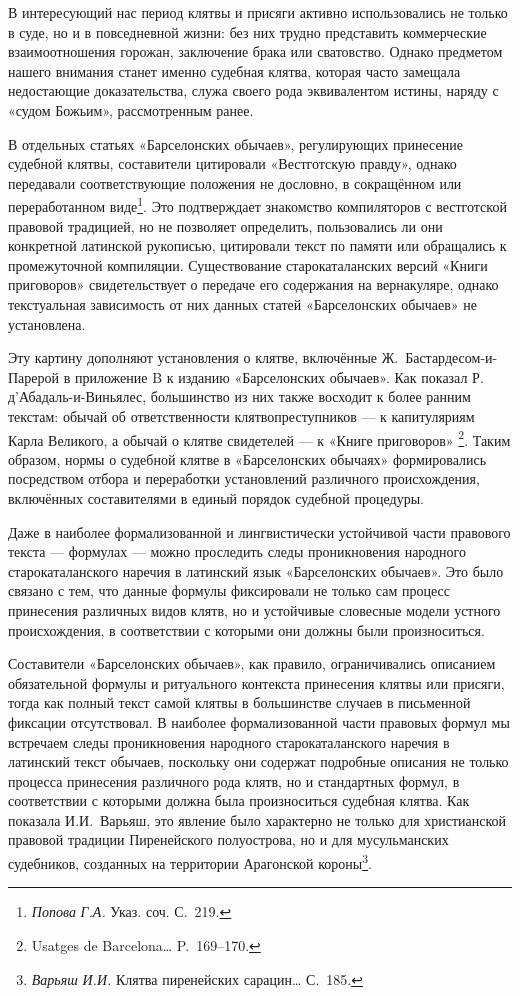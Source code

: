 В интересующий нас период клятвы и присяги активно использовались не только в суде, но и в повседневной жизни: без них трудно представить коммерческие взаимоотношения горожан, заключение брака или сватовство. Однако предметом нашего внимания станет именно судебная клятва, которая часто замещала недостающие доказательства, служа своего рода эквивалентом истины, наряду с «судом Божьим», рассмотренным ранее.

В отдельных статьях «Барселонских обычаев», регулирующих принесение судебной клятвы, составители цитировали «Вестготскую правду», однако передавали соответствующие положения не дословно, в сокращённом или переработанном виде\footnote{\emph{Попова}\emph{ }\emph{Г}\emph{.}\emph{А}\emph{. }Указ. соч. С.~219.}. Это подтверждает знакомство компиляторов с вестготской правовой традицией, но не позволяет определить, пользовались ли они конкретной латинской рукописью, цитировали текст по памяти или обращались к промежуточной компиляции. Существование старокаталанских версий «Книги приговоров» свидетельствует о передаче его содержания на вернакуляре, однако текстуальная зависимость от них данных статей «Барселонских обычаев» не установлена.

Эту картину дополняют установления о клятве, включённые Ж.~Бастардесом-и-Парерой в приложение B к изданию «Барселонских обычаев». Как показал Р. д’Абадаль-и-Виньялес, большинство из них также восходит к более ранним текстам: обычай об ответственности клятвопреступников --- к капитуляриям Карла Великого, а обычай о клятве свидетелей --- к «Книге приговоров» \footnote{Usatges de Barcelona… P.~169--170.}. Таким образом, нормы о судебной клятве в «Барселонских обычаях» формировались посредством отбора и переработки установлений различного происхождения, включённых составителями в единый порядок судебной процедуры.

Даже в наиболее формализованной и лингвистически устойчивой части правового текста --- формулах --- можно проследить следы проникновения народного старокаталанского наречия в латинский язык «Барселонских обычаев». Это было связано с тем, что данные формулы фиксировали не только сам процесс принесения различных видов клятв, но и устойчивые словесные модели устного происхождения, в соответствии с которыми они должны были произноситься.

Составители «Барселонских обычаев», как правило, ограничивались описанием обязательной формулы и ритуального контекста принесения клятвы или присяги, тогда как полный текст самой клятвы в большинстве случаев в письменной фиксации отсутствовал. В наиболее формализованной части правовых формул мы встречаем следы проникновения народного старокаталанского наречия в латинский текст обычаев, поскольку они содержат подробные описания не только процесса принесения различного рода клятв, но и стандартных формул, в соответствии с которыми должна была произноситься судебная клятва. Как показала И.И.~Варьяш, это явление было характерно не только для христианской правовой традиции Пиренейского полуострова, но и для мусульманских судебников, созданных на территории Арагонской короны\footnote{\emph{Варьяш}\emph{ И.И. }Клятва пиренейских сарацин… С.~185.}.

